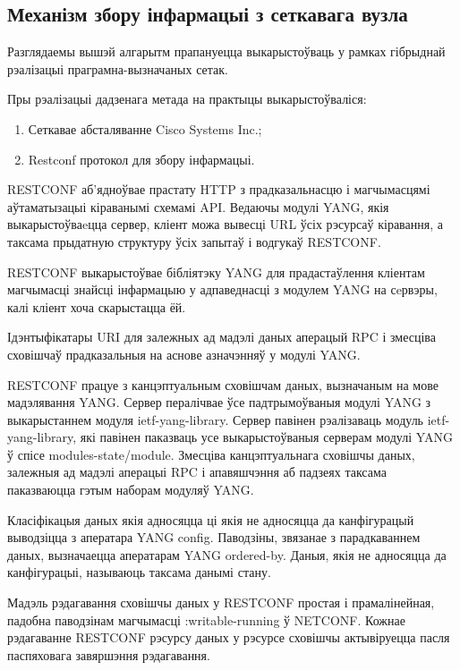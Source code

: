 \subsection{Механізм збору інфармацыі з сеткавага вузла}

Разглядаемы вышэй алгарытм прапануецца выкарыстоўваць у рамках гібрыднай
рэалізацыі праграмна-вызначаных сетак.

Пры рэалізацыі дадзенага метада на практыцы выкарыстоўваліся:
\begin{enumerate}
    \item Сеткавае абсталяванне Cisco Systems Inc.;
    \item Restconf протокол для збору інфармацыі.
\end{enumerate}

RESTCONF аб'ядноўвае прастату HTTP з прадказальнасцю і магчымасцямі аўтаматызацыі кіраванымі схемамі API. Ведаючы модулі YANG, якія выкарыстоўваeцца сервер, кліент можа вывесці URL ўсіх рэсурсаў кіравання, а таксама прыдатную структуру ўсіх запытаў і водгукаў RESTCONF.

RESTCONF выкарыстоўвае бібліятэку YANG для прадастаўлення кліентам магчымасці знайсці інфармацыю у адпаведнасці з модулем YANG на сeрвэры, калі кліент хоча скарыстацца ёй.

Ідэнтыфікатары URI для залежных ад мадэлі даных аперацый RPC і змесціва сховішчаў прадказальныя на аснове азначэнняў у модулі YANG.

RESTCONF працуе з канцэптуальным сховішчам даных, вызначаным на мове мадэлявання YANG. Сервер пералічвае ўсе падтрымоўваныя модулі YANG з выкарыстаннем модуля ietf-yang-library. Сервер павінен рэалізаваць модуль ietf-yang-library, які павінен паказваць усе выкарыстоўваныя серверам модулі YANG ў спісе modules-state/module. Змесціва канцэптуальнага сховішчы даных, залежныя ад мадэлі аперацыі RPC і апавяшчэння аб падзеях таксама паказваюцца гэтым наборам модуляў YANG.

Класіфікацыя даных якія адносяцца ці якія не адносяцца да канфігурацый выводзіцца з аператара YANG config. Паводзіны, звязанае з парадкаваннем даных, вызначаецца аператарам YANG ordered-by. Даныя, якія не адносяцца да канфігурацыі, называюць таксама данымі стану.

Мадэль рэдагавання сховішчы даных у RESTCONF простая і прамалінейная, падобна паводзінам магчымасці :writable-running ў NETCONF. Кожнае рэдагаванне RESTCONF рэсурсу даных у рэсурсе сховішчы актывіруецца пасля паспяховага завяршэння рэдагавання.

